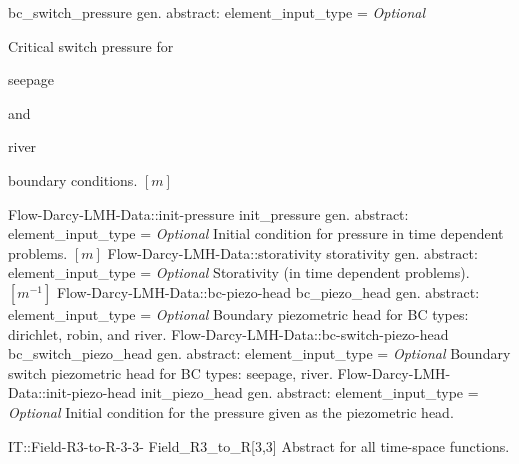 \begin{RecordType}
			{bc{\_}switch{\_}pressure}
			{{gen. abstract: }}{{element{\_}input{\_}type}{ = }}
			{ \it{Optional}}
			{{{Critical switch pressure for }\begin{ttfamily}seepage\end{ttfamily}{ and }\begin{ttfamily}river\end{ttfamily}{ boundary conditions. }{$[m]$}%
}}
		\RecKey
			{Flow-Darcy-LMH-Data::init-pressure}
			{init{\_}pressure}
			{{gen. abstract: }}{{element{\_}input{\_}type}{ = }}
			{ \it{Optional}}
			{{{Initial condition for pressure in time dependent problems. }{$[m]$}%
}}
		\RecKey
			{Flow-Darcy-LMH-Data::storativity}
			{storativity}
			{{gen. abstract: }}{{element{\_}input{\_}type}{ = }}
			{ \it{Optional}}
			{{{Storativity (in time dependent problems). }{$[m^{-1}]$}%
}}
		\RecKey
			{Flow-Darcy-LMH-Data::bc-piezo-head}
			{bc{\_}piezo{\_}head}
			{{gen. abstract: }}{{element{\_}input{\_}type}{ = }}
			{ \it{Optional}}
			{{{Boundary piezometric head for BC types: dirichlet, robin, and river.}%
}}
		\RecKey
			{Flow-Darcy-LMH-Data::bc-switch-piezo-head}
			{bc{\_}switch{\_}piezo{\_}head}
			{{gen. abstract: }}{{element{\_}input{\_}type}{ = }}
			{ \it{Optional}}
			{{{Boundary switch piezometric head for BC types: seepage, river.}%
}}
		\RecKey
			{Flow-Darcy-LMH-Data::init-piezo-head}
			{init{\_}piezo{\_}head}
			{{gen. abstract: }}{{element{\_}input{\_}type}{ = }}
			{ \it{Optional}}
			{{{Initial condition for the pressure given as the piezometric head.}%
}}
\end{RecordType}
\begin{AbstractType}
	{IT::Field-R3-to-R-3-3-}
	{Field{\_}R3{\_}to{\_}R[3,3]}
	{}
	{{{Abstract for all time-space functions.}%
}}
\end{AbstractType}
